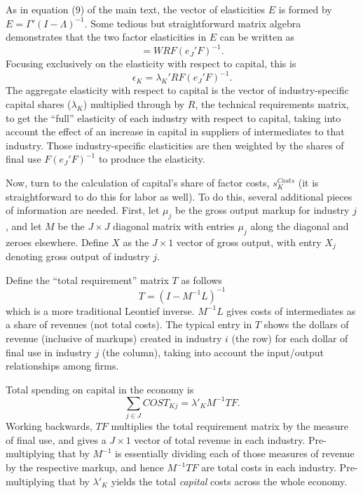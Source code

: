 \documentclass[11pt]{article}
\begin{document}
As in equation (9) of the main text, the vector of elasticities $E$ is formed by $E = \Gamma'(I-\Lambda)^{-1}$. Some tedious but straightforward matrix algebra demonstrates that the two factor elasticities in $E$ can be written as
\begin{equation}
	[\epsilon_K \text{ } \epsilon_L] = WRF(e_J'F)^{-1}. 
\end{equation}
Focusing exclusively on the elasticity with respect to capital, this is
\begin{equation}
	\epsilon_K = \lambda_K'RF(e_J'F)^{-1}. \label{EQ_epK_decomp}
\end{equation}
The aggregate elasticity with respect to capital is the vector of industry-specific capital shares ($\lambda_K$) multiplied through by $R$, the technical requirements matrix, to get the ``full'' elasticity of each industry with respect to capital, taking into account the effect of an increase in capital in suppliers of intermediates to that industry. Those industry-specific elasticities are then weighted by the shares of final use $F(e_J'F)^{-1}$ to produce the elasticity.

Now, turn to the calculation of capital's share of factor costs, $s_K^{Costs}$ (it is straightforward to do this for labor as well). To do this, several additional pieces of information are needed. First, let $\mu_j$ be the gross output markup for industry $j$, and let $M$ be the $J \times J$ diagonal matrix with entries $\mu_j$ along the diagonal and zeroes elsewhere. Define $X$ as the $J \times 1$ vector of gross output, with entry $X_j$ denoting gross output of industry $j$. 

Define the ``total requirement'' matrix $T$ as follows
\begin{equation}
	T = (I - M^{-1}L)^{-1}
\end{equation}
which is a more traditional Leontief inverse. $M^{-1}L$ gives costs of intermediates as a share of revenues (not total costs). The typical entry in $T$ shows the dollars of revenue (inclusive of markups) created in industry $i$ (the row) for each dollar of final use in industry $j$ (the column), taking into account the input/output relationships among firms.

Total spending on capital in the economy is
\begin{equation}
	\sum_{j \in J} COST_{Kj} = \lambda'_K M^{-1} T F. 
\end{equation}
Working backwards, $T F$ multiplies the total requirement matrix by the measure of final use, and gives a $J \times 1$ vector of total revenue in each industry. Pre-multiplying that by $M^{-1}$ is essentially dividing each of those measures of revenue by the respective markup, and hence $M^{-1} T F$ are total costs in each industry. Pre-multiplying that by $\lambda'_K$ yields the total \textit{capital} costs across the whole economy. 
\end{document}
